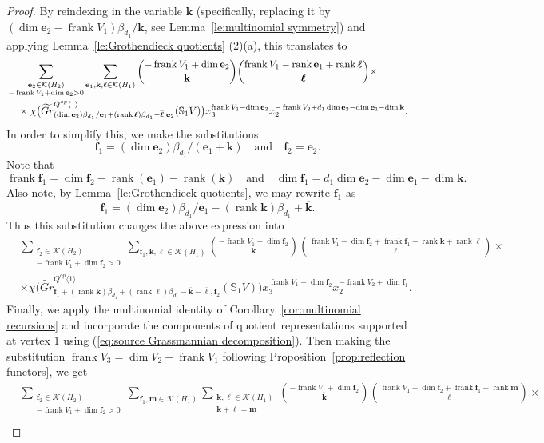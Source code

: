 \documentclass{amsart}
\numberwithin{equation}{section}
\theoremstyle{definition}
\def\SS{\mathbb{S}}
\def\bfe{\mathbf{e}}
\def\bff{\mathbf{f}}
\def\bfk{\mathbf{k}}
\def\bfl{{\ensuremath{\boldsymbol\ell}}}
\def\bfm{\mathbf{m}}
\def\cK{\mathcal{K}}
\def\dim{\operatorname{dim}}
\def\frank{\operatorname{frank}}
\def\rank{\operatorname{rank}}
\newcommand{\rev}[1]{\overline{#1}}%
\renewcommand{\eqref}[1]{{\rm (\ref{#1})}}
\begin{document}
\begin{proof}
  By reindexing in the variable $\bfk$ (specifically, replacing it by $(\dim\bfe_2-\frank V_1)\beta_{d_1}/\bfk$, see Lemma~\ref{le:multinomial symmetry}) and applying Lemma~\ref{le:Grothendieck quotients} (2)(a), this translates to
  \begin{align*}
    &\sum\limits_{\substack{\bfe_2\in\cK(H_2)\\-\frank V_1+\dim\bfe_2>0}}\sum\limits_{\bfe_1,\bfk,\bfl\in\cK(H_1)}{-\frank V_1+\dim\bfe_2\choose\bfk}{\frank V_1-\rank\bfe_1+\rank\bfl\choose\bfl}\times\\
    &\hspace{0.15in}\times\chi\big(\widetilde{Gr}^{Q^{op}\langle 1\rangle}_{(\dim\bfe_2)\beta_{d_1}/\bfe_1+(\rank\bfl)\beta_{d_1}-\rev{\bfl},\bfe_2}(\SS_1 V)\big)x_3^{\frank V_1-\dim\bfe_2}x_2^{-\frank V_2+d_1\dim\bfe_2-\dim\bfe_1-\dim\bfk}.
  \end{align*}  
  In order to simplify this, we make the substitutions 
  \[\bff_1=(\dim\bfe_2)\beta_{d_1}/(\bfe_1+\bfk)\quad\text{and}\quad\bff_2=\bfe_2.\]
  Note that 
  \[\frank\bff_1=\dim\bff_2-\rank(\bfe_1)-\rank(\bfk)\quad\text{and}\quad\dim\bff_1=d_1\dim\bfe_2-\dim\bfe_1-\dim\bfk.\]
  Also note, by Lemma~\ref{le:Grothendieck quotients}, we may rewrite $\bff_1$ as
  \[\bff_1=(\dim\bfe_2)\beta_{d_1}/\bfe_1-(\rank\bfk)\beta_{d_1}+\rev{\bfk}.\]
  Thus this substitution changes the above expression into
  \begin{align*}
    &\sum\limits_{\substack{\bff_2\in\cK(H_2)\\-\frank V_1+\dim\bff_2>0}}\sum\limits_{\bff_1,\bfk,\bfl\in\cK(H_1)}{-\frank V_1+\dim\bff_2\choose\bfk}{\frank V_1-\dim\bff_2+\frank\bff_1+\rank\bfk+\rank\bfl\choose\bfl}\times\\
    &\times\chi\big(\widetilde{Gr}^{Q^{op}\langle 1\rangle}_{\bff_1+(\rank\bfk)\beta_{d_1}+(\rank\bfl)\beta_{d_1}-\rev{\bfk}-\rev{\bfl},\bff_2}(\SS_1 V)\big)x_3^{\frank V_1-\dim\bff_2}x_2^{-\frank V_2+\dim\bff_1}.
  \end{align*}
  Finally, we apply the multinomial identity of Corollary~\ref{cor:multinomial recursions} and incorporate the components of quotient representations supported at vertex $1$ using \eqref{eq:source Grassmannian decomposition}.  Then making the substitution $\frank V_3=\dim V_2-\frank V_1$ following Proposition~\ref{prop:reflection functors},
  we get
  \begin{align*}
    &\sum\limits_{\substack{\bff_2\in\cK(H_2)\\-\frank V_1+\dim\bff_2>0}}\sum\limits_{\bff_1,\bfm\in\cK(H_1)}\sum\limits_{\substack{\bfk,\bfl\in\cK(H_1)\\\bfk+\bfl=\bfm}}{-\frank V_1+\dim\bff_2\choose\bfk}{\frank V_1-\dim\bff_2+\frank\bff_1+\rank\bfm\choose\bfl}\times\\

\end{align*}
\end{proof}
\end{document}
